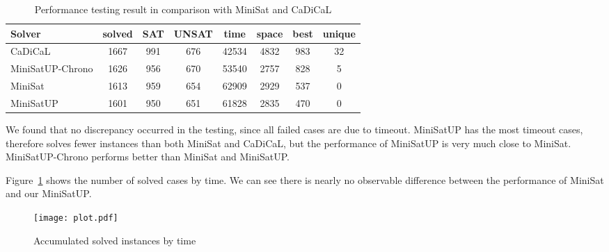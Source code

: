 \begin{table}[!htbp]
  \centering
  \begin{tabular}{lccccccc}
    \hline
    Solver & solved & SAT & UNSAT & time & space & best & unique \\
    \hline
    CaDiCaL          & 1667 & 991 & 676 & 42534 & 4832 & 983 & 32 \\
    MiniSatUP-Chrono & 1626 & 956 & 670 & 53540 & 2757 & 828 & 5 \\
    MiniSat          & 1613 & 959 & 654 & 62909 & 2929 & 537 & 0 \\
    MiniSatUP        & 1601 & 950 & 651 & 61828 & 2835 & 470 & 0 \\
    \hline
  \end{tabular}
  \caption{Performance testing result in comparison with MiniSat and CaDiCaL}
  \label{tab:perf}
\end{table}

We found that no discrepancy occurred in the testing, since all failed cases are due to timeout. MiniSatUP has the most timeout cases, therefore solves fewer instances than both MiniSat and CaDiCaL, but the performance of MiniSatUP is very much close to MiniSat. MiniSatUP-Chrono performs better than MiniSat and MiniSatUP.

Figure~\ref{fig:cdf} shows the number of solved cases by time. We can see there is nearly no observable difference between the performance of MiniSat and our MiniSatUP.

\begin{figure}[h]
  \centering
  \texttt{[image: plot.pdf]}
  \caption{Accumulated solved instances by time}
  \label{fig:cdf}
\end{figure}
